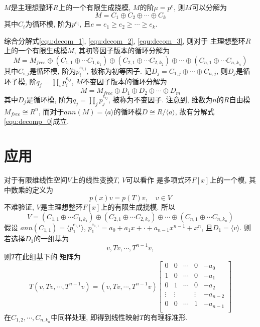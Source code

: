 \begin{theorem}
	$M$是主理想整环$R$上的一个有限生成挠模, 
	$M$的阶$\mu = p^e$,
	则$M$可以分解为
	\begin{equation}
	M = C_1 \oplus C_2 \oplus \cdots \oplus C_k
	\label{equ:decom_3}
	\end{equation}
	其中$C_i$为循环模, 阶为$p^{e_i}$,  且$e = e_1 \ge e_2 \ge \cdots \ge e_k$.
\end{theorem}

综合分解式\eqref{equ:decom_1}, \eqref{equ:decom_2}, \eqref{equ:decom_3},
则对于
主理想整环$R$上的一个有限生成模$M$,
其初等因子版本的循环分解为
\begin{equation}
M = M_{free} 
    \oplus (C_{1,1}\oplus \cdots C_{1,k_1})
    \oplus (C_{2,1}\oplus \cdots C_{2,k_2})
	\oplus \cdots
    \oplus (C_{n,1}\oplus \cdots C_{n,k_n})
\end{equation}
其中$C_{i,j}$是循环模, 阶为$p_i^{e_{i,j}}$, 被称为初等因子.
记$D_j = C_{1,j} \oplus \cdots \oplus C_{n,j}$, 
则$D_j$是循环子模, 阶$q_j = \prod_{i} p_i^{e_{ij}}$,
$M$不变因子版本的循环分解为
\begin{equation}
M = M_{free} 
    \oplus D_1 
    \oplus D_2 
	\oplus \cdots
    \oplus D_m
\end{equation}
其中$D_j$是循环模, 阶为$q_j = \prod_{j} p_j^{e_{ij}}$, 被称为不变因子.
注意到, 维数为$n$的$R$自由模$M_{free} \cong R^n$,
而对于$ann(M) = \langle a \rangle$的循环模$D \cong R/\langle a \rangle$,
故有分解式\eqref{equ:decomp_0}成立.

\section{应用}
对于有限维线性空间$V$上的线性变换$T$, $V$可以看作
是多项式环$F[x]$上的一个模, 其中数乘的定义为
\begin{equation}
\nonumber
p(x)v = p(T)v, \quad v \in V
\end{equation}
不难验证, $V$是主理想整环$F[x]$上的有限生成挠模.
所以
\begin{equation}
\nonumber
V = (C_{1,1}\oplus \cdots C_{1,k_1})
    \oplus (C_{2,1}\oplus \cdots C_{2,k_2})
	\oplus \cdots
    \oplus (C_{n,1}\oplus \cdots C_{n,k_n})
\end{equation}
假设
$ann(C_{1,1}) = 
\langle p_1^{e_{1,1}} \rangle$,
$p_1^{e_{1,1}} = a_0 + a_1 x + \cdot + a_{n-1} x^{n-1} + x^n$,
且$D_1  = \langle v \rangle$.
则若选择$D_1$的一组基为
$$v, Tv, \cdots, T^{n-1}v,$$
则$T$在此组基下的
矩阵为
\begin{equation}
T(v, Tv, \cdots, T^{n-1}v)
= (v, Tv, \cdots, T^{n-1}v)
\begin{bmatrix}
	0& 0& \cdots &0 & -a_0\\
	1& 0& \cdots &0 & -a_1\\
	0& 1& \cdots &0 & -a_2\\
	\vdots& \vdots& &\vdots& -a_{n-2}\\
	0& 0& \cdots& 1& -a_{n-1}\\
\end{bmatrix}
\end{equation}
在$C_{1,2}, \cdots, C_{n,k_n}$中同样处理, 即得到线性映射$T$的有理标准形.

